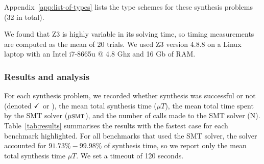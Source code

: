 %
Appendix~\ref{app:list-of-types} lists the type schemes for these
synthesis problems (32 in total).

We found that Z3 is highly variable in its solving time, so timing
measurements are computed as the mean of 20 trials. We used
Z3 version 4.8.8 on a Linux laptop with an Intel i7-8665u @ 4.8 Ghz
and 16 Gb of RAM.

\subsubsection{Results and analysis}
%
For each synthesis problem, we recorded whether synthesis
was successful or not (denoted $\checkmark$ or \fail), the mean
total synthesis time ($\mu{T}$), the mean total time spent by
the SMT solver ($\mu\textsc{smt}$), and the number of
calls made to the SMT solver (\textsc{N}).
Table~\ref{tab:results} summarises the results with the fastest case for each
benchmark highlighted.
For all benchmarks that used
the SMT solver, the solver accounted for $91.73\%-99.98\%$
of synthesis time, so we report only the mean
total synthesis time $\mu{T}$. %
We set a timeout of 120 seconds.

